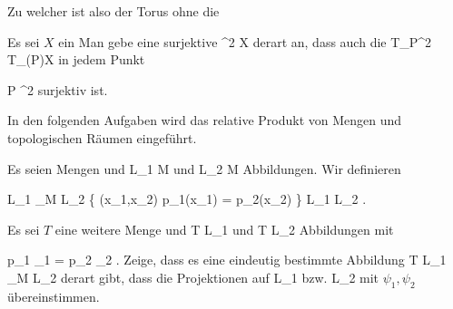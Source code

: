 {}
{

Zu welcher
ist
 also der Torus ohne die

}
{} {}

{}
{

Es sei $X$ ein
Man gebe eine surjektive
\maabbdisp {\varphi} {\R^2} {X
} {}
derart an, dass auch die
 { T_P\R^2 } { T_{\varphi(P)}X
} {}
in jedem Punkt

\mavergleichskette
{\vergleichskette
{ P
}
{ \in }{ \R^2
}
{  }{
}
{    }{
}
{   }{
}
}
{}{}{}
surjektiv ist.

}
{} {}

In den folgenden Aufgaben wird das relative Produkt von Mengen und topologischen Räumen eingeführt.

{}
{

Es seien
 Mengen und
 {L_1 } { M
} {}
und
 {L_2 } { M
} {}
Abbildungen. Wir definieren

\mavergleichskettedisp
{\vergleichskette
{L_1 \times_M L_2
}
{ } { \left\{ (x_1,x_2)  \mid   p_1(x_1) = p_2(x_2)         \right\}
}
{ \subseteq} { L_1 \times L_2
}
{ } {
}
{ } {
}
}
{}{}{.}
 {Es sei $T$ eine weitere Menge und
 { T } { L_1
} {}
und
 { T } { L_2
} {}
Abbildungen mit

\mavergleichskettedisp
{\vergleichskette
{ p_1 \circ \psi_1
}
{ =} { p_2 \circ \psi_2
}
{ } {
}
{ } {
}
{ } {}
}
{}{}{.}
Zeige, dass es eine eindeutig bestimmte Abbildung
\maabbdisp {\psi} { T } { L_1 \times_M L_2
} {}
derart gibt, dass die Projektionen auf
\mathkor {} {L_1} {bzw.} {L_2} {}
mit $\psi_1,\psi_2$ übereinstimmen.
}

}
{} {}

